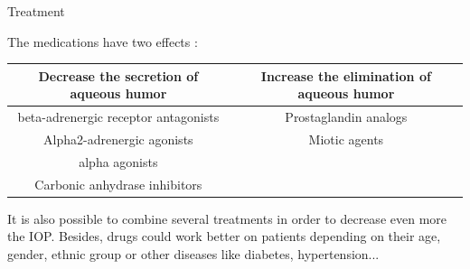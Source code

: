 \begin{frame}{Treatment}

The medications have two effects :
\newline
\\
\begin{tabular}{|c|c|}
\hline
Decrease the secretion of aqueous humor & Increase the elimination of aqueous humor\\
\hline
beta-adrenergic receptor antagonists & Prostaglandin analogs \\
Alpha2-adrenergic agonists & Miotic agents \\
alpha agonists &  \\
Carbonic anhydrase inhibitors &  \\
\hline
\end{tabular}
\newline
\newline
It is also possible to combine several treatments in order to decrease even more the IOP.
Besides, drugs could work better on patients depending on their age, gender, ethnic group or other diseases like diabetes, hypertension...

\end{frame}

